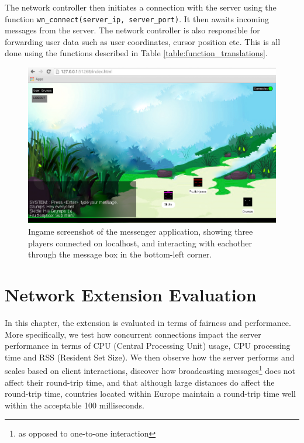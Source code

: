 \documentclass[bsc, 12pt, twoside, singlespacing, parskip, abbrevs, notimes, normalheadings, logo, deptreport]{styles/infthesis}
\begin{document}
The network controller then initiates a connection with the server using the function \texttt{wn\_connect(server\_ip, server\_port)}. It then awaits incoming messages from the server. The network controller is also responsible for forwarding user data such as user coordinates, cursor position etc. This is all done using the functions described in Table \ref{table:function_translations}.
\vspace{4em}

\begin{figure}[H]
\centering
\includegraphics[scale=0.44]{images/messenger.jpg}
\caption{Ingame screenshot of the messenger application, showing three players connected on localhost, and interacting with eachother through the message box in the bottom-left corner.}
\label{fig:messenger}
\end{figure}



\chapter{Network Extension Evaluation}
In this chapter, the extension is evaluated in terms of fairness and performance. More specifically, we test how concurrent connections impact the server performance in terms of CPU (Central Processing Unit) usage, CPU processing time and RSS (Resident Set Size). We then observe how the server performs and scales based on client interactions, discover how broadcasting messages\footnote{as opposed to one-to-one interaction} does not affect their round-trip time, and that although large distances do affect the round-trip time, countries located within Europe maintain a round-trip time well within the acceptable 100 milliseconds.
\end{document}
